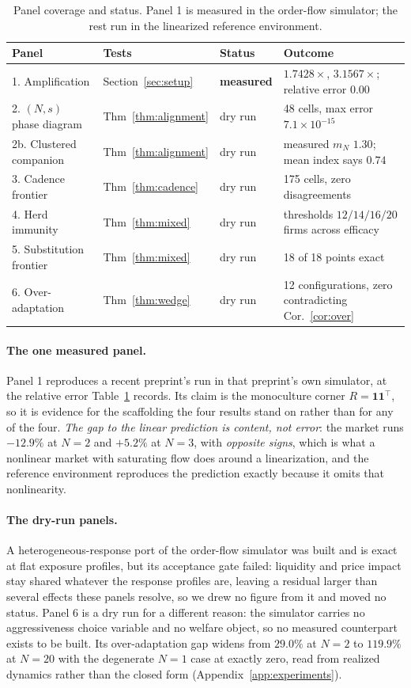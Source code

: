 \documentclass{article}
\theoremstyle{plain}
\theoremstyle{definition}
\newcommand{\mN}{m_N}
\begin{document}
\begin{table}[!t]
\centering
\caption{Panel coverage and status. Panel 1 is measured in the order-flow simulator; the rest run in the linearized reference environment.}
\label{tab:panels}
\small
\begin{tabular}{llll}
\toprule
Panel & Tests & Status & Outcome \\
\midrule
1. Amplification & Section~\ref{sec:setup} & \textbf{measured} & $1.7428\times$, $3.1567\times$; relative error $0.00$ \\
2. $(N,s)$ phase diagram & Thm~\ref{thm:alignment} & dry run & 48 cells, max error $7.1\times 10^{-15}$ \\
2b. Clustered companion & Thm~\ref{thm:alignment} & dry run & measured $\mN$ $1.30$; mean index says $0.74$ \\
3. Cadence frontier & Thm~\ref{thm:cadence} & dry run & 175 cells, zero disagreements \\
4. Herd immunity & Thm~\ref{thm:mixed} & dry run & thresholds $12/14/16/20$ firms across efficacy \\
5. Substitution frontier & Thm~\ref{thm:mixed} & dry run & 18 of 18 points exact \\
6. Over-adaptation & Thm~\ref{thm:wedge} & dry run & 12 configurations, zero contradicting Cor.~\ref{cor:over} \\
\bottomrule
\end{tabular}
\end{table}

\paragraph{The one measured panel.}
Panel 1 reproduces a recent preprint's run in that preprint's own simulator, at the relative error Table~\ref{tab:panels} records. Its claim is the monoculture corner $R = \mathbf{1}\mathbf{1}^{\top}$, so it is evidence for the scaffolding the four results stand on rather than for any of the four. \emph{The gap to the linear prediction is content, not error}: the market runs $-12.9\%$ at $N=2$ and $+5.2\%$ at $N=3$, with \emph{opposite signs}, which is what a nonlinear market with saturating flow does around a linearization, and the reference environment reproduces the prediction exactly because it omits that nonlinearity.

\paragraph{The dry-run panels.}
A heterogeneous-response port of the order-flow simulator was built and is exact at flat exposure profiles, but its acceptance gate failed: liquidity and price impact stay shared whatever the response profiles are, leaving a residual larger than several effects these panels resolve, so we drew no figure from it and moved no status. Panel 6 is a dry run for a different reason: the simulator carries no aggressiveness choice variable and no welfare object, so no measured counterpart exists to be built. Its over-adaptation gap widens from $29.0\%$ at $N=2$ to $119.9\%$ at $N=20$ with the degenerate $N=1$ case at exactly zero, read from realized dynamics rather than the closed form (Appendix~\ref{app:experiments}).
\end{document}
